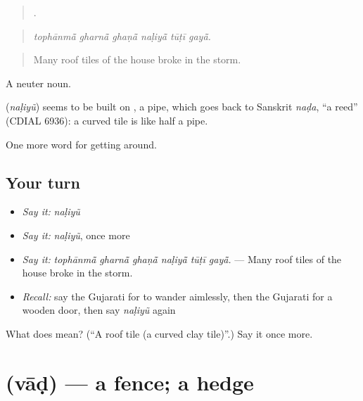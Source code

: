 \begin{quote}
     .
\end{quote}

\begin{quote}
\emph{tophānmā̃ gharnā̃ ghaṇā̃ naḷiyā̃ tūṭī gayā̃.}
\end{quote}

\begin{quote}
Many roof tiles of the house broke in the storm.
\end{quote}

A neuter noun.

\begin{cousinweb}
\textbf{} (\emph{naḷiyũ}) seems to be built on , a pipe, which goes back to Sanskrit \emph{naḍa}, \textquotedblleft{}a reed\textquotedblright{} (CDIAL 6936): a curved tile is like half a pipe.
\end{cousinweb}

\begin{grammarlens}[title={What you've built}]
One more word for getting around.
\end{grammarlens}

\subsection*{Your turn}
\begin{itemize}
\raggedright
  \item \emph{Say it:} \emph{naḷiyũ}
  \item \emph{Say it:} \emph{naḷiyũ}, once more
  \item \emph{Say it:} \emph{tophānmā̃ gharnā̃ ghaṇā̃ naḷiyā̃ tūṭī gayā̃.} — Many roof tiles of the house broke in the storm.
  \item \emph{Recall:} say the Gujarati for to wander aimlessly, then the Gujarati for a wooden door, then say \emph{naḷiyũ} again
\end{itemize}

\begin{tcolorbox}[breakable,colback=teal!4,colframe=teal!35!black,title={Before you move on}]
What does  mean? (\textquotedblleft{}A roof tile (a curved clay tile)\textquotedblright{}.) Say it once more.
\end{tcolorbox}
\section[\texorpdfstring{\gu{વાડ} (vāḍ)}{વાડ (vāḍ)}]{ (vāḍ) — a fence; a hedge}

